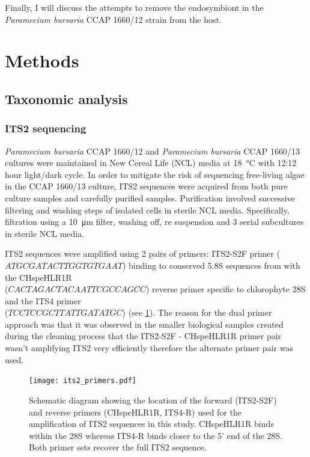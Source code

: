 Finally, I will discuss the attempts to remove the endosymbiont in the 
\textit{Paramecium bursaria} CCAP 1660/12 strain from the host.

\section{Methods}

\subsection{Taxonomic analysis}
    
\subsubsection{ITS2 sequencing}

\textit{Paramecium bursaria} CCAP 1660/12 and \textit{Paramecium bursaria} CCAP 
1660/13 cultures were maintained in New Cereal Life (NCL) media
at \SI{18}{\degreeCelsius} with 12:12 hour light/dark cycle.  In order to mitigate
the risk of sequencing free-living algae in the CCAP 1660/13 culture, ITS2
sequences were acquired from both pure culture samples and carefully purified samples.
Purification involved successive filtering and washing steps of isolated cells in sterile NCL media. 
Specifically, filtration using a \SI{10}{\micro\metre} filter, washing off, re suspension and 3 serial subcultures
in sterile NCL media. 

ITS2 sequences were amplified using 2 pairs of primers: ITS2-S2F primer (\(ATGCGATACTTGGTGTGAAT\))
binding to conserved 5.8S sequences from \citep{Chen2010} with the CHspeHLR1R \\
(\(CACTAGACTACAATTCGCCAGCC\))
reverse primer specific to chlorophyte 28S \citep{Hoshina2004} and the ITS4 primer \\
(\(TCCTCCGCTTATTGATATGC\))
\citep{white1990amplification} (see \cref{fig:its2_primers}).  The reason for the dual primer
approach was that it was observed in the smaller biological samples created during the cleaning
process that the ITS2-S2F - CHspeHLR1R primer pair wasn't amplifying ITS2 very efficiently
therefore the alternate primer pair was used. 

\begin{figure}
    \texttt{[image: its2\_primers.pdf]}
    \caption[ITS2 primer locations]{Schematic diagram showing the location of the forward (ITS2-S2F) and reverse
    primers (CHspeHLR1R, ITS4-R) used for the amplification of ITS2 sequences in this study.
    CHspeHLR1R binds within the 28S whereas ITS4-R binds closer to the 5' end of the 28S.  Both
primer sets recover the full ITS2 sequence.}
    \label{fig:its2_primers}
\end{figure}

